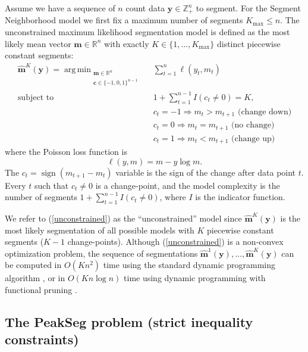 \documentclass{article}
\DeclareMathOperator*{\argmin}{arg\,min}
\DeclareMathOperator*{\sign}{sign}
\newcommand{\ZZ}{\mathbb Z}
\newcommand{\RR}{\mathbb R}
\begin{document}
Assume we have a sequence of $n$ count data $\mathbf y\in\ZZ_+^n$ to
segment. For the Segment Neighborhood model we first fix a maximum
number of segments $ K_{\max}\leq n$. The unconstrained maximum
likelihood segmentation model is defined as the most likely mean
vector $\mathbf m\in\RR^n$ with exactly 
$K\in\{1, \dots, K_{\max}\}$ distinct piecewise constant segments:
\begin{align}
  \label{unconstrained}
  \mathbf{\hat m}^K(\mathbf y) =
    \argmin_{\substack{
  \mathbf m\in\RR^{n}
\\
  \mathbf c\in\{-1,0,1\}^{n-1}
  }} &\ \ 
    \sum_{t=1}^n \ell( y_t, m_t) 
\\
    \text{subject to} &\ \  1+\sum_{t=1}^{n-1} I(c_t \neq 0) = K, 
\nonumber\\
& \ \ c_t = -1 \Rightarrow m_{t} > m_{t+1} \text{ (change down)}
\nonumber\\
& \ \ c_t = 0 \Rightarrow m_{t} = m_{t+1}  \text{ (no change)}
\nonumber\\
& \ \ c_t = 1 \Rightarrow m_{t} < m_{t+1} \text{ (change up)}
\nonumber
\end{align}
where the Poisson loss function is
\begin{equation}\label{eq:loss}
  \ell( y, m)= m - y \log m.
\end{equation} 
The $c_t = \sign(m_{t+1} - m_{t})$ variable is the sign of the change
after data point $t$. Every $t$ such that $c_t \neq 0$ is a
change-point, and the model complexity is the number of segments
$1+\sum_{t=1}^{n-1} I(c_t \neq 0)$, where $I$ is the indicator
function. 

We refer to (\ref{unconstrained}) as the ``unconstrained'' model
since $\mathbf{\hat m}^K(\mathbf y)$ is the most likely segmentation
of all possible models with $K$ piecewise constant segments ($K-1$
change-points). 
Although (\ref{unconstrained}) is a non-convex optimization problem,
the sequence of segmentations
$\mathbf{\hat m}^1(\mathbf y), \dots, \mathbf{\hat m}^{K}(\mathbf y)$
can be computed in $O(K n^2)$ time using the standard dynamic
programming algorithm \citep{bellman}, or in $O(K n \log n)$ time
using dynamic programming with functional pruning \citep{pruned-dp,
  johnson, Segmentor}.

\subsection{The PeakSeg problem (strict inequality constraints)}
\label{sec:constrained}
\end{document}
